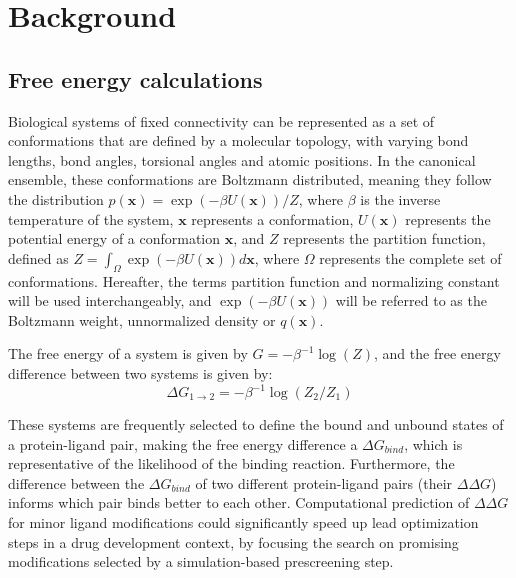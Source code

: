 
\chapter{Background}


\section{Free energy calculations}

Biological systems of fixed connectivity can be represented as a set of conformations that are defined by a molecular topology, with varying bond lengths, bond angles, torsional angles and atomic positions\cite{shirts2007alchemical,christ2010basic,pohorille2010good}. In the canonical ensemble, these conformations are Boltzmann distributed, meaning they follow the distribution $p(\boldsymbol{x})=\exp(-\beta U(\boldsymbol{x})) / Z$, where $\beta$ is the inverse temperature of the system, $\boldsymbol{x}$ represents a conformation, $U(\boldsymbol{x})$ represents the potential energy of a conformation $\boldsymbol{x}$, and $Z$ represents the partition function, defined as $Z=\int_\Omega \exp(-\beta U(\boldsymbol{x})) d\boldsymbol{x}$, where $\Omega$ represents the complete set of conformations. Hereafter, the terms partition function and normalizing constant will be used interchangeably, and $\exp(-\beta U(\boldsymbol{x}))$ will be referred to as the Boltzmann weight, unnormalized density or $q(\boldsymbol{x})$.

The free energy of a system is given by $G=-\beta^{-1} \log(Z)$, and the free energy difference between two systems is given by: 
\begin{equation}\label{freeeneqn} 
\Delta G_{1\rightarrow2} = -\beta^{-1} \log(Z_2/Z_1)
\end{equation} 

\noindent These systems are frequently selected to define the bound and unbound states of a protein-ligand pair, making the free energy difference a $\Delta G_{bind}$, which is representative of the likelihood of the binding reaction. Furthermore, the difference between the $\Delta G_{bind}$ of two different protein-ligand pairs (their $\Delta \Delta G$) informs which pair binds better to each other.
Computational prediction of $\Delta \Delta G$ for minor ligand modifications could significantly speed up lead optimization steps in a drug development context, by focusing the search on promising modifications selected by a simulation-based prescreening step.

